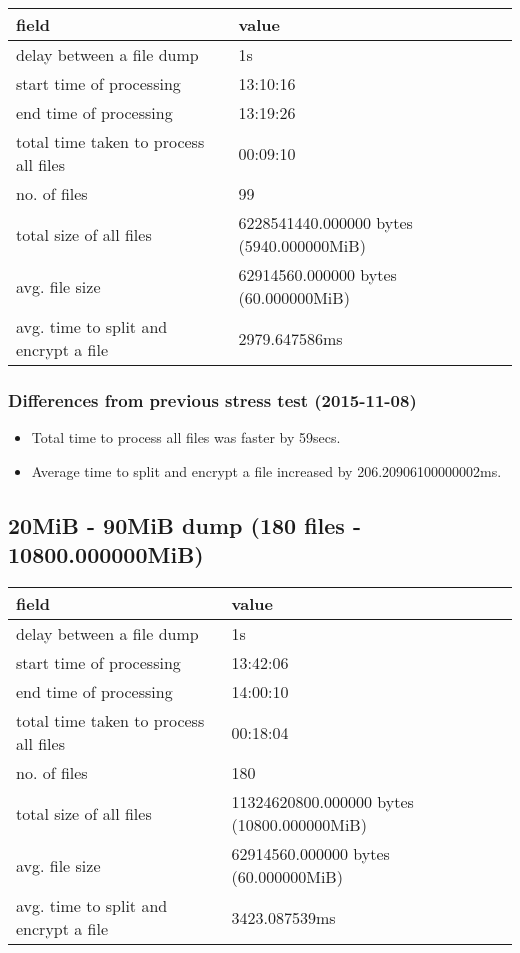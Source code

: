 \begin{center}
\begin{tabular}{ll}
field & value\\
\hline
delay between a file dump & 1s\\
start time of processing & 13:10:16\\
end time of processing & 13:19:26\\
total time taken to process all files & 00:09:10\\
no. of files & 99\\
total size of all files & 6228541440.000000 bytes (5940.000000MiB)\\
avg. file size & 62914560.000000 bytes (60.000000MiB)\\
avg. time to split and encrypt a file & 2979.647586ms\\
\end{tabular}
\end{center}

\subsubsection{Differences from previous stress test (2015-11-08)}

\begin{itemize}
\item Total time to process all files was faster by 59secs.
\item Average time to split and encrypt a file increased by
  206.20906100000002ms.
\end{itemize}

\subsection{20MiB - 90MiB dump (180 files - 10800.000000MiB)}\label{5-st-10800}

\begin{center}
\begin{tabular}{ll}
field & value\\
\hline
delay between a file dump & 1s\\
start time of processing & 13:42:06\\
end time of processing & 14:00:10\\
total time taken to process all files & 00:18:04\\
no. of files & 180\\
total size of all files & 11324620800.000000 bytes (10800.000000MiB)\\
avg. file size & 62914560.000000 bytes (60.000000MiB)\\
avg. time to split and encrypt a file & 3423.087539ms\\
\end{tabular}
\end{center}

